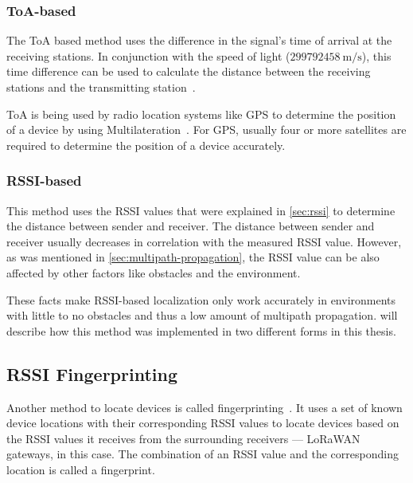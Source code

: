 \subsubsection{\acs{ToA}-based}\label{sec:toa-based-multilateration}

The \acf{ToA} based method uses the difference in the signal's time of arrival at the receiving stations.
In conjunction with the speed of light ($299792458\ \mathrm{m/s}$), this time difference can be used to calculate the distance between the receiving stations and the transmitting station~\cite{khalaf-allah_time_2015}.

\ac{ToA} is being used by radio location systems like \ac{GPS} to determine the position of a device by using Multilateration~\cite{department_of_defense_usa_gps_2020}.
For GPS, usually four or more satellites are required to determine the position of a device accurately.

\subsubsection{\acs{RSSI}-based}\label{sec:rssi-based-multilateration}

This method uses the \acf{RSSI} values that were explained in \cref{sec:rssi} to determine the distance between sender and receiver.
The distance between sender and receiver usually decreases in correlation with the measured \ac{RSSI} value.
However, as was mentioned in \cref{sec:multipath-propagation}, the \ac{RSSI} value can be also affected by other factors like obstacles and the environment.

These facts make \ac{RSSI}-based localization only work accurately in environments with little to no obstacles and thus a low amount of multipath propagation.
 will describe how this method was implemented in two different forms in this thesis.

\subsection{\acs{RSSI} Fingerprinting}\label{sec:rssi-fingerprinting}

Another method to locate devices is called fingerprinting~\cite{xia_indoor_2017}.
It uses a set of known device locations with their corresponding \ac{RSSI} values to locate devices based on the \ac{RSSI} values it receives from the surrounding receivers --- \ac{LoRaWAN} gateways, in this case.
The combination of an \ac{RSSI} value and the corresponding location is called a fingerprint.

